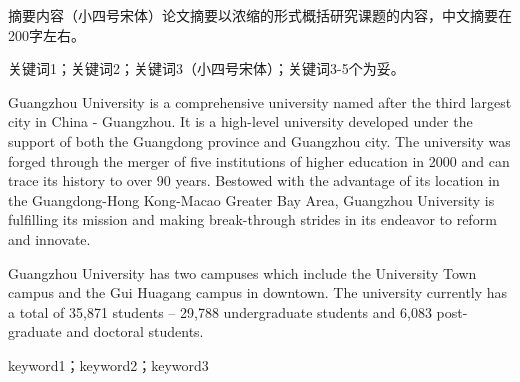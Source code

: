 

\makehead


\begin{cnabstract}
摘要内容（小四号宋体）论文摘要以浓缩的形式概括研究课题的内容，中文摘要在200字左右。
\end{cnabstract}

\begin{cnkeyword}
关键词1；关键词2；关键词3（小四号宋体）；关键词3-5个为妥。
\end{cnkeyword}

\begin{engabstract}
Guangzhou University is a comprehensive university named after the third largest city in China - Guangzhou. It is a high-level university developed under the support of both the Guangdong province and Guangzhou city. The university was forged through the merger of five institutions of higher education in 2000 and can trace its history to over 90 years. Bestowed with the advantage of its location in the Guangdong-Hong Kong-Macao Greater Bay Area, Guangzhou University is fulfilling its mission and making break-through strides in its endeavor to reform and innovate. 

Guangzhou University has two campuses which include the University Town campus and the Gui Huagang campus in downtown. The university currently has a total of 35,871 students – 29,788 undergraduate students and 6,083 post-graduate and doctoral students.
\end{engabstract}

\begin{engkeyword}
 keyword1；keyword2；keyword3
\end{engkeyword}


